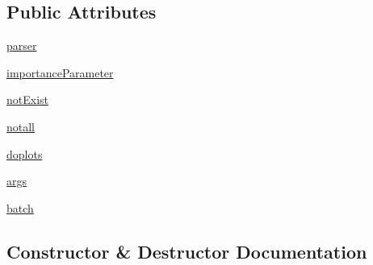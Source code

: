 \subsection*{Public Attributes}
\begin{DoxyCompactItemize}
\item 
\mbox{\hyperlink{classparamgrid_1_1batchjob__args_1_1batchArgs_a02be3cf93127e121c1f3b54168bb387a}{parser}}
\item 
\mbox{\hyperlink{classparamgrid_1_1batchjob__args_1_1batchArgs_a293df872e7c0e41d061f99ee7a772d51}{importance\+Parameter}}
\item 
\mbox{\hyperlink{classparamgrid_1_1batchjob__args_1_1batchArgs_ad2924073b3302cd932a6a446491f7f14}{not\+Exist}}
\item 
\mbox{\hyperlink{classparamgrid_1_1batchjob__args_1_1batchArgs_a4dc6c78becc0fe37a40bf286afdffc80}{notall}}
\item 
\mbox{\hyperlink{classparamgrid_1_1batchjob__args_1_1batchArgs_a4c71a7232a1315fae1ea2001b6a3d927}{doplots}}
\item 
\mbox{\hyperlink{classparamgrid_1_1batchjob__args_1_1batchArgs_ade3f5d3931c87514969bf852cbbe7237}{args}}
\item 
\mbox{\hyperlink{classparamgrid_1_1batchjob__args_1_1batchArgs_ac81fe201dd1936846f35238f74dc92de}{batch}}
\end{DoxyCompactItemize}


\subsection{Constructor \& Destructor Documentation}
\mbox{\label{classparamgrid_1_1batchjob__args_1_1batchArgs_a08e7f06c80273e155efbb4e5706adc92}} 
